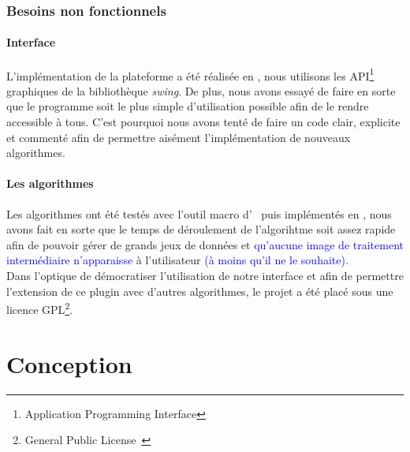 \documentclass[11pt,a4paper]{report}
\begin{document}
\subsection{Besoins non fonctionnels}
\subsubsection{Interface}
\noindent
L'implémentation de la plateforme a été réalisée en \java, nous utilisons les API\footnote{Application Programming Interface} graphiques de la bibliothèque \emph{swing}. De plus, nous avons essayé de faire en sorte que le programme soit le plus simple d'utilisation possible afin de le rendre accessible à tous. C'est pourquoi nous avons tenté de faire un code clair, explicite et commenté afin de permettre aisément l'implémentation de nouveaux algorithmes.

\subsubsection{Les algorithmes}
\noindent
Les algorithmes ont été testés avec l'outil macro d' \imj ~puis implémentés en \java, nous avons fait en sorte que le temps de déroulement de l'algorihtme soit assez rapide  afin de pouvoir gérer de grands jeux de données et \textcolor{blue}{qu'aucune image de traitement intermédiaire n'apparaisse} à l'utilisateur \textcolor{blue}{(à moins qu'il ne le souhaite)}.\\

Dans l'optique de démocratiser l'utilisation de notre interface et afin de permettre l'extension de ce plugin avec d'autres algorithmes, le projet a été placé sous une licence GPL\footnote{General Public License~\cite{GPL:url}}.

\noindent

\chapter{Conception}
\end{document}

